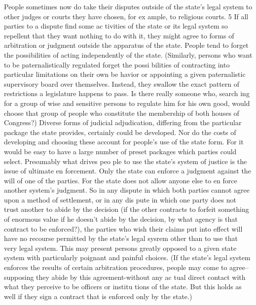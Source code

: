 \documentclass[11pt,openany]{book}
\begin{document}
People sometimes now do take their disputes outside of the state's legal system to other judges or courts they have chosen, for ex ample, to religious courts. 5 If all parties to a dispute find some ac tivities of the state or its legal system so repellent that they want nothing to do with it, they might agree to forms of arbitration or judgment outside the apparatus of the state. People tend to forget the possibilities of acting independently of the state. (Similarly, persons who want to be paternalistically regulated forget the possi bilities of contracting into particular limitations on their own be havior or appointing a given paternalistic supervisory board over themselves. Instead, they swallow the exact pattern of restrictions a legislature happens to pass. Is there really someone who, search ing for a group of wise and sensitive persons to regulate him for his own good, would choose that group of people who constitute the membership of both houses of Congress?) Diverse forms of judicial adjudication, differing from the particular package the state provides, certainly could be developed. Nor do the costs of developing and choosing these account for people's use of the state form. For it would be easy to have a large number of preset packages which parties could select. Presumably what drives peo ple to use the state's system of justice is the issue of ultimate en forcement. Only the state can enforce a judgment against the will of one of the parties. For the state does not allow anyone else to en force another system's judgment. So in any dispute in which both parties cannot agree upon a method of settlement, or in any dis pute in which one party does not trust another to abide by the decision (if the other contracts to forfeit something of enormous value if he doesn't abide by the decision, by what agency is that contract to be enforced?), the parties who wish their claims put into effect will have no recourse permitted by the state's legal sysrem other than to use that very legal system. This may present persons greatly opposed to a given state system with particularly poignant and painful choices. (If the state's legal system enforces the results of certain arbitration procedures, people may come to agree--supposing they abide by this agreement-without any ac tual direct contact with what they perceive to be officers or institu tions of the state. But this holds as well if they sign a contract that is enforced only by the state.) 
\end{document}
